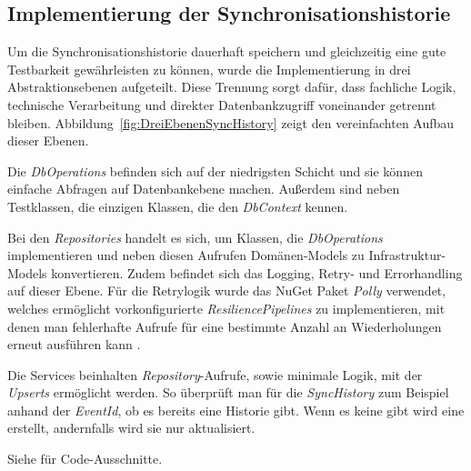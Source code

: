 \subsection{Implementierung der Synchronisationshistorie}
\label{sec:ImplementierungSync}
Um die Synchronisationshistorie dauerhaft speichern und gleichzeitig eine gute Testbarkeit gewährleisten zu können,
wurde die Implementierung in drei Abstraktionsebenen aufgeteilt.
Diese Trennung sorgt dafür, dass fachliche Logik, technische Verarbeitung und direkter Datenbankzugriff voneinander getrennt bleiben.
Abbildung~\ref{fig:DreiEbenenSyncHistory} zeigt den vereinfachten Aufbau dieser Ebenen.
\par\smallskip
Die \textit{DbOperations} befinden sich auf der niedrigsten Schicht und sie können einfache Abfragen auf Datenbankebene machen. 
Außerdem sind neben Testklassen, die einzigen Klassen, die den \textit{DbContext} kennen.
\par\smallskip
Bei den \textit{Repositories} handelt es sich, um Klassen, die \textit{DbOperations} implementieren und neben diesen Aufrufen Domänen-Models
zu Infrastruktur-Models konvertieren. Zudem befindet sich das Logging, Retry- und Errorhandling auf dieser Ebene. Für die Retrylogik wurde das NuGet Paket \textit{Polly}
verwendet, welches ermöglicht vorkonfigurierte \textit{ResiliencePipelines} zu implementieren, mit denen man fehlerhafte Aufrufe für eine bestimmte Anzahl
an Wiederholungen erneut ausführen kann \cite{PollyDocs}.
\par\smallskip
Die Services beinhalten \textit{Repository}-Aufrufe, sowie minimale Logik, mit der \textit{Upserts} ermöglicht werden.
So überprüft man für die \textit{SyncHistory} zum Beispiel anhand der \textit{EventId}, ob es bereits eine Historie gibt. 
Wenn es keine gibt wird eine erstellt, andernfalls wird sie nur aktualisiert.
\par\smallskip
Siehe  für Code-Ausschnitte.


